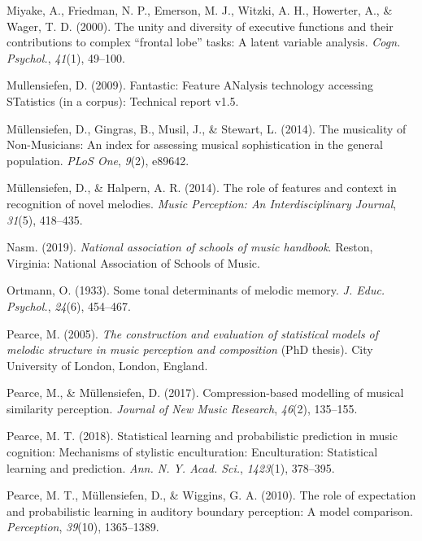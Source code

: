 \documentclass[english,man]{apa6}
\begin{document}
\leavevmode\hypertarget{ref-Miyake2000-mh}{}%
Miyake, A., Friedman, N. P., Emerson, M. J., Witzki, A. H., Howerter, A., \& Wager, T. D. (2000). The unity and diversity of executive functions and their contributions to complex ``frontal lobe'' tasks: A latent variable analysis. \emph{Cogn. Psychol.}, \emph{41}(1), 49--100.

\leavevmode\hypertarget{ref-Mullensiefen2009-dx}{}%
Mullensiefen, D. (2009). Fantastic: Feature ANalysis technology accessing STatistics (in a corpus): Technical report v1.5.

\leavevmode\hypertarget{ref-Mullensiefen2014-kl}{}%
Müllensiefen, D., Gingras, B., Musil, J., \& Stewart, L. (2014). The musicality of Non-Musicians: An index for assessing musical sophistication in the general population. \emph{PLoS One}, \emph{9}(2), e89642.

\leavevmode\hypertarget{ref-Mullensiefen2014-ta}{}%
Müllensiefen, D., \& Halpern, A. R. (2014). The role of features and context in recognition of novel melodies. \emph{Music Perception: An Interdisciplinary Journal}, \emph{31}(5), 418--435.

\leavevmode\hypertarget{ref-Nasm2019-fs}{}%
Nasm. (2019). \emph{National association of schools of music handbook}. Reston, Virginia: National Association of Schools of Music.

\leavevmode\hypertarget{ref-Ortmann1933-ty}{}%
Ortmann, O. (1933). Some tonal determinants of melodic memory. \emph{J. Educ. Psychol.}, \emph{24}(6), 454--467.

\leavevmode\hypertarget{ref-Pearce2005-hb}{}%
Pearce, M. (2005). \emph{The construction and evaluation of statistical models of melodic structure in music perception and composition} (PhD thesis). City University of London, London, England.

\leavevmode\hypertarget{ref-Pearce2017-rr}{}%
Pearce, M., \& Müllensiefen, D. (2017). Compression-based modelling of musical similarity perception. \emph{Journal of New Music Research}, \emph{46}(2), 135--155.

\leavevmode\hypertarget{ref-Pearce2018-lb}{}%
Pearce, M. T. (2018). Statistical learning and probabilistic prediction in music cognition: Mechanisms of stylistic enculturation: Enculturation: Statistical learning and prediction. \emph{Ann. N. Y. Acad. Sci.}, \emph{1423}(1), 378--395.

\leavevmode\hypertarget{ref-Pearce2010-mw}{}%
Pearce, M. T., Müllensiefen, D., \& Wiggins, G. A. (2010). The role of expectation and probabilistic learning in auditory boundary perception: A model comparison. \emph{Perception}, \emph{39}(10), 1365--1389.
\end{document}

